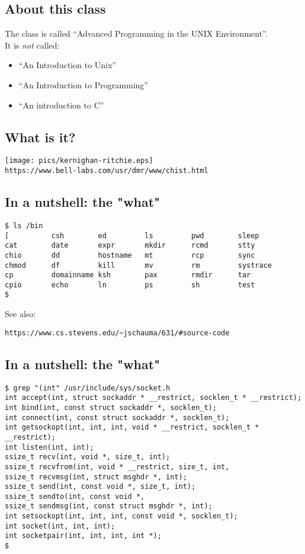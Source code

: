 \documentclass[sxga]{xdvislides}
\begin{document}
\subsection{About this class}
The class is called ``Advanced Programming in the UNIX
Environment''.\\

It is {\em not} called:
\begin{itemize}
	\item ``An Introduction to Unix''
	\item ``An Introduction to Programming''
	\item ``An introduction to C''
\end{itemize}


\subsection{What is it?}
\begin{center}
\texttt{[image: pics/kernighan-ritchie.eps]} \\
\verb+https://www.bell-labs.com/usr/dmr/www/chist.html+
\end{center}

\subsection{In a nutshell: the "what"}
\begin{verbatim}
$ ls /bin
[          csh        ed         ls         pwd        sleep
cat        date       expr       mkdir      rcmd       stty
chio       dd         hostname   mt         rcp        sync
chmod      df         kill       mv         rm         systrace
cp         domainname ksh        pax        rmdir      tar
cpio       echo       ln         ps         sh         test
$
\end{verbatim}
\addvspace{.5in}

See also:
\begin{verbatim}
https://www.cs.stevens.edu/~jschauma/631/#source-code
\end{verbatim}

\subsection{In a nutshell: the "what"}
\begin{verbatim}
$ grep "(int" /usr/include/sys/socket.h
int	accept(int, struct sockaddr * __restrict, socklen_t * __restrict);
int	bind(int, const struct sockaddr *, socklen_t);
int	connect(int, const struct sockaddr *, socklen_t);
int	getsockopt(int, int, int, void * __restrict, socklen_t * __restrict);
int	listen(int, int);
ssize_t	recv(int, void *, size_t, int);
ssize_t	recvfrom(int, void * __restrict, size_t, int,
ssize_t	recvmsg(int, struct msghdr *, int);
ssize_t	send(int, const void *, size_t, int);
ssize_t	sendto(int, const void *,
ssize_t	sendmsg(int, const struct msghdr *, int);
int	setsockopt(int, int, int, const void *, socklen_t);
int	socket(int, int, int);
int	socketpair(int, int, int, int *);
$
\end{verbatim}
\end{document}
